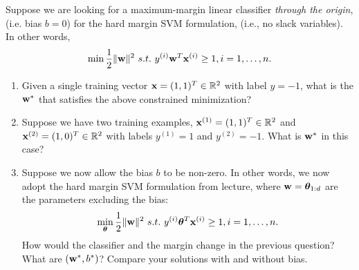 \documentclass[11pt]{article}
\begin{document}

\vspace{-0.5in}

\newcommand{\bftheta}{\boldsymbol\theta}
\newcommand{\bfalpha}{\boldsymbol\alpha}



Suppose we are looking for a maximum-margin linear classifier \emph{through the origin}, (i.e. bias $b=0$) for the hard margin SVM formulation, (i.e., no slack variables). In other words, 
\begin{equation*}
    \min \frac{1}{2}\Vert{\mathbf w} \Vert^2\ s.t.\  y^{(i)} {\mathbf w}^T {\mathbf x}^{(i)} \geq 1, i = 1, \ldots, n.
\end{equation*}


\begin{enumerate}

\item {} Given a single training vector ${\mathbf x} = (1,1)^T \in \mathbb{R}^2$ with label $y = -1$, what is the ${\mathbf w}^\ast$ that satisfies the above constrained minimization?
\vspace{3cm}

\item {} Suppose we have two training examples, ${\mathbf x}^{(1)} = (1,1)^T \in \mathbb{R}^2$ and ${\mathbf x}^{(2)} = (1,0)^T \in \mathbb{R}^2$ with labels $y^{(1)} = 1$ and $y^{(2)} = -1$. What is ${\mathbf w}^\ast$ in this case?
\vspace{3cm}

\item {} Suppose we now allow the bias $b$ to be non-zero. In other words, we now adopt the hard margin SVM formulation from lecture, where ${\mathbf w} = \boldsymbol{\theta}_{1:d}$ are the parameters excluding the bias:
\begin{equation*}
    \min_{\boldsymbol{\theta}} \frac{1}{2}\Vert{\mathbf w} \Vert^2\ s.t.\  y^{(i)} \boldsymbol{\theta}^T {\mathbf x}^{(i)} \geq 1, i = 1, \ldots, n.
\end{equation*}
How would the classifier and the margin change in the previous question? What are $({\mathbf w}^\ast, b^\ast)$? Compare your solutions with and without bias.
\vspace{6cm}

\end{enumerate}
\end{document}
